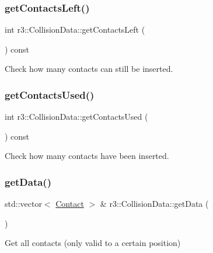 \subsubsection{\texorpdfstring{get\+Contacts\+Left()}{getContactsLeft()}}
{\footnotesize\ttfamily int r3\+::\+Collision\+Data\+::get\+Contacts\+Left (\begin{DoxyParamCaption}{ }\end{DoxyParamCaption}) const}



Check how many contacts can still be inserted. 

\mbox{\label{classr3_1_1_collision_data_aaf0e65914133cd35cc32224df851561e}} 
\subsubsection{\texorpdfstring{get\+Contacts\+Used()}{getContactsUsed()}}
{\footnotesize\ttfamily int r3\+::\+Collision\+Data\+::get\+Contacts\+Used (\begin{DoxyParamCaption}{ }\end{DoxyParamCaption}) const}



Check how many contacts have been inserted. 

\mbox{\label{classr3_1_1_collision_data_acb1bb23e8d0f37f0ebc39e8f7642419f}} 
\subsubsection{\texorpdfstring{get\+Data()}{getData()}\hspace{0.1cm}{\footnotesize\ttfamily [1/2]}}
{\footnotesize\ttfamily std\+::vector$<$ \mbox{\hyperlink{classr3_1_1_contact}{Contact}} $>$ \& r3\+::\+Collision\+Data\+::get\+Data (\begin{DoxyParamCaption}{ }\end{DoxyParamCaption})}



Get all contacts (only valid to a certain position) 

